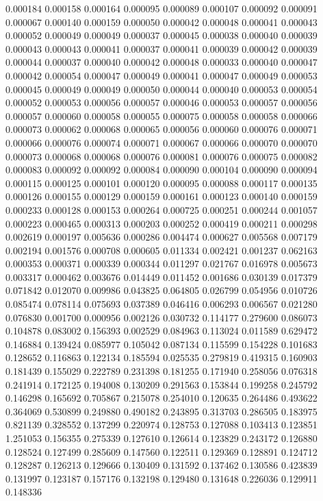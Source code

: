 0.000184
0.000158
0.000164
0.000095
0.000089
0.000107
0.000092
0.000091
0.000067
0.000140
0.000159
0.000050
0.000042
0.000048
0.000041
0.000043
0.000052
0.000049
0.000049
0.000037
0.000045
0.000038
0.000040
0.000039
0.000043
0.000043
0.000041
0.000037
0.000041
0.000039
0.000042
0.000039
0.000044
0.000037
0.000040
0.000042
0.000048
0.000033
0.000040
0.000047
0.000042
0.000054
0.000047
0.000049
0.000041
0.000047
0.000049
0.000053
0.000045
0.000049
0.000049
0.000050
0.000044
0.000040
0.000053
0.000054
0.000052
0.000053
0.000056
0.000057
0.000046
0.000053
0.000057
0.000056
0.000057
0.000060
0.000058
0.000055
0.000075
0.000058
0.000058
0.000066
0.000073
0.000062
0.000068
0.000065
0.000056
0.000060
0.000076
0.000071
0.000066
0.000076
0.000074
0.000071
0.000067
0.000066
0.000070
0.000070
0.000073
0.000068
0.000068
0.000076
0.000081
0.000076
0.000075
0.000082
0.000083
0.000092
0.000092
0.000084
0.000090
0.000104
0.000090
0.000094
0.000115
0.000125
0.000101
0.000120
0.000095
0.000088
0.000117
0.000135
0.000126
0.000155
0.000129
0.000159
0.000161
0.000123
0.000140
0.000159
0.000233
0.000128
0.000153
0.000264
0.000725
0.000251
0.000244
0.001057
0.000223
0.000465
0.000313
0.000203
0.000252
0.000419
0.000211
0.000298
0.002619
0.000197
0.005636
0.000286
0.004474
0.000627
0.005568
0.007179
0.002194
0.001576
0.000708
0.000605
0.011334
0.002421
0.001237
0.062163
0.000353
0.000371
0.000339
0.000344
0.011297
0.021767
0.016978
0.005673
0.003317
0.000462
0.003676
0.014449
0.011452
0.001686
0.030139
0.017379
0.071842
0.012070
0.009986
0.043825
0.064805
0.026799
0.054956
0.010726
0.085474
0.078114
0.075693
0.037389
0.046416
0.006293
0.006567
0.021280
0.076830
0.001700
0.000956
0.002126
0.030732
0.114177
0.279600
0.086073
0.104878
0.083002
0.156393
0.002529
0.084963
0.113024
0.011589
0.629472
0.146884
0.139424
0.085977
0.105042
0.087134
0.115599
0.154228
0.101683
0.128652
0.116863
0.122134
0.185594
0.025535
0.279819
0.419315
0.160903
0.181439
0.155029
0.222789
0.231398
0.181255
0.171940
0.258056
0.076318
0.241914
0.172125
0.194008
0.130209
0.291563
0.153844
0.199258
0.245792
0.146298
0.165692
0.705867
0.215078
0.254010
0.120635
0.264486
0.493622
0.364069
0.530899
0.249880
0.490182
0.243895
0.313703
0.286505
0.183975
0.821139
0.328552
0.137299
0.220974
0.128753
0.127088
0.103413
0.123851
1.251053
0.156355
0.275339
0.127610
0.126614
0.123829
0.243172
0.126880
0.128524
0.127499
0.285609
0.147560
0.122511
0.129369
0.128891
0.124712
0.128287
0.126213
0.129666
0.130409
0.131592
0.137462
0.130586
0.423839
0.131997
0.123187
0.157176
0.132198
0.129480
0.131648
0.226036
0.129911
0.148336
